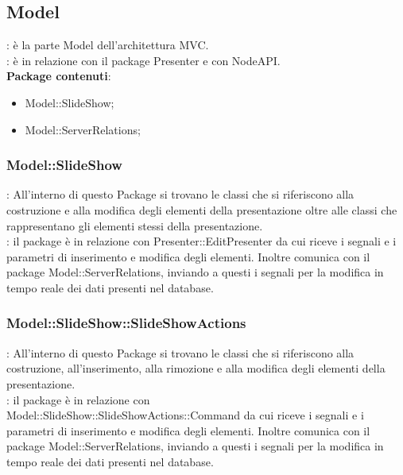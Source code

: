 \subsection{Model}{
	\textbf{\tipo}: è la parte Model dell'architettura MVC.\\
	\textbf{\relaz}: è in relazione con il package Presenter e con NodeAPI.\\
	\textbf{Package contenuti}: 
	\begin{itemize}
	\item Model::SlideShow;
    \item Model::ServerRelations;
	\end{itemize}
}
\subsubsection{Model::SlideShow}{
		\textbf{\tipo}: All’interno di questo Package si trovano le classi che si riferiscono alla costruzione e alla modifica degli elementi della presentazione oltre alle classi che rappresentano gli elementi stessi della presentazione.\\
        \textbf{\relaz}: il package è in relazione con Presenter::EditPresenter da cui riceve i segnali e i parametri di inserimento e modifica degli elementi. Inoltre comunica con il package Model::ServerRelations, inviando a questi i segnali per la modifica in tempo reale dei dati presenti nel database.\\
    }
\subsubsection{Model::SlideShow::SlideShowActions}{
		\textbf{\tipo}: All’interno di questo Package si trovano le classi che si riferiscono alla costruzione, all'inserimento, alla rimozione e alla modifica degli elementi della presentazione.\\
        \textbf{\relaz}: il package è in relazione con\\ Model::SlideShow::SlideShowActions::Command da cui riceve i segnali e i parametri di inserimento e modifica degli elementi. Inoltre comunica con il package Model::ServerRelations, inviando a questi i segnali per la modifica in tempo reale dei dati presenti nel database.\\
    }
    
